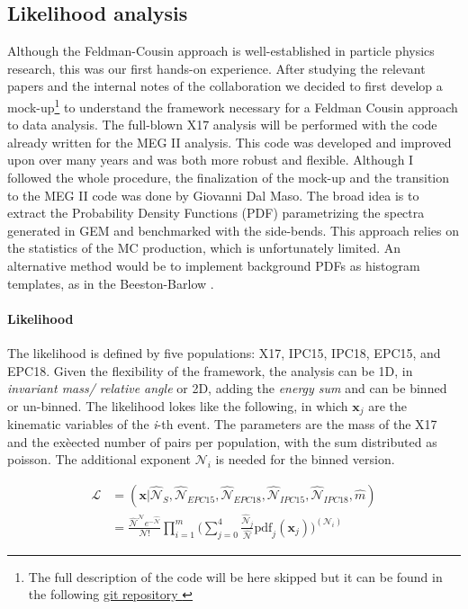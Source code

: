 \begin{refsection}
    \subsection{Likelihood analysis}
        Although the Feldman-Cousin approach is well-established in particle physics research, this was our first hands-on experience. 
        After studying the relevant papers \cite{feldman:1998}\cite{feldman:2011} and the internal notes of the collaboration we decided to first develop a mock-up\footnote{The full description of the code will be here skipped but it can be found in the following         \href{https://github.com/gdalmaso96/X17_LL_mock_up}{\underline{git repository \faGithubSquare}}} to understand the framework necessary for a Feldman Cousin approach to data analysis.  
        The full-blown X17 analysis will be performed with the code already written for the MEG II analysis. 
        This code was developed and improved upon over many years and was both more robust and flexible. 
        Although I followed the whole procedure, the finalization of the mock-up and the transition to the MEG II code was done by Giovanni Dal Maso. 
        The broad idea is to extract the Probability Density Functions (PDF) parametrizing the spectra generated in GEM and benchmarked with the side-bends.
        This approach relies on the statistics of the MC production, which is unfortunately limited.
        An alternative method would be to implement background PDFs as histogram templates, as in the Beeston-Barlow \cite{X17:likelihood:BB}.

        \paragraph{Likelihood}
        The likelihood is defined by five populations: X17, IPC15, IPC18, EPC15, and EPC18.
        Given the flexibility of the framework, the analysis can be 1D, in \textit{invariant mass/ relative angle} or 2D, adding the \textit{energy sum} and can be binned or un-binned.
        The likelihood lokes like the following, in which $\textbf{x}_j$ are the kinematic variables of the \textit{i}-th event.
        The parameters are the mass of the X17 and the exèected number of pairs per population, with the sum distributed as poisson.
        The additional exponent $\mathcal{N}_i$ is needed for the binned version.
        
        \begin{align}
            \mathcal{L} &= (\textbf{x} | \hat{\mathcal{N}}_{S}, \hat{\mathcal{N}}_{EPC15}, \hat{\mathcal{N}}_{EPC18}, \hat{\mathcal{N}}_{IPC15}, \hat{\mathcal{N}}_{IPC18}, \hat{m}) \\
            &= \frac{\hat{\mathcal{N}}^\mathcal{N} e^{-\hat{\mathcal{N}}} }{\mathcal{N}!}  \prod_{i=1}^{m} \Big( \sum_{j=0}^{4} \frac{\hat{\mathcal{N}}_{j}}{\hat{\mathcal{N}}} \text{pdf}_j(\textbf{x}_j)\Big)^{(\mathcal{N}_i)}
        \end{align}


\end{refsection}
